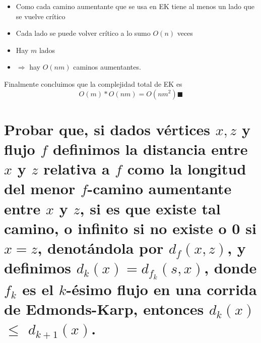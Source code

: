 \documentclass[11pt, a4paper]{article}
\theoremstyle{definition}
\begin{document}
\begin{itemize}
                \begin{itemize}
                    \item Como cada camino aumentante que se usa en EK tiene al menos un lado que se vuelve crítico
                    \item Cada lado se puede volver crítico a lo sumo $O(n)$ veces
                    \item Hay $m$ lados
                    \item $\Rightarrow$ hay $O(nm)$ caminos aumentantes.
                \end{itemize}
                Finalmente concluimos que la complejidad total de EK es 
                \[
                O(m)*O(nm) = O(nm^2) \blacksquare
                \]   
    \end{itemize}
\section{Probar que, si dados vértices $x,z$ y flujo $f$ definimos la distancia entre $x$ y $z$ relativa a $f$ como la longitud del menor
        $f$-camino aumentante entre $x$ y $z$, si es que existe tal camino, o infinito si no existe o 0 si $x=z$, denotándola por $d_f(x,z)$,
        y definimos $d_k(x)=d_{f_k}(s,x)$, donde $f_k$ es el $k$-ésimo flujo en una corrida de Edmonds-Karp, entonces $d_k(x)$ $\leq$ $d_{k+1}(x)$.}
\end{document}
